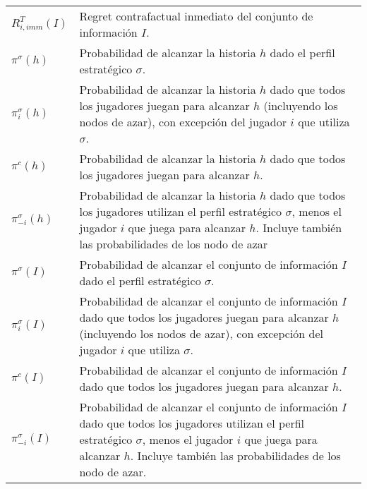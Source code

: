 \begingroup
\renewcommand{\arraystretch}{1.5}
\begin{tabular}{l p{12cm}}
$R^T_{i, imm}(I)$ & Regret contrafactual inmediato del conjunto de información $I$. \\
$\pi^{\sigma}(h)$ & Probabilidad de alcanzar la historia $h$ dado el perfil estratégico $\sigma$. \\
$\pi^{\sigma}_i(h)$ & Probabilidad de alcanzar la historia $h$ dado que todos los jugadores juegan para alcanzar $h$ (incluyendo los nodos de azar), con excepción del jugador $i$ que utiliza $\sigma$. \\
$\pi^c(h)$ & Probabilidad de alcanzar la historia $h$ dado que todos los jugadores juegan para alcanzar $h$. \\
$\pi^{\sigma}_{-i}(h)$ & Probabilidad de alcanzar la historia $h$ dado que todos los jugadores utilizan el perfil estratégico $\sigma$, menos el jugador $i$ que juega para alcanzar $h$. Incluye también las probabilidades de los nodo de azar \\
$\pi^{\sigma}(I)$ & Probabilidad de alcanzar el conjunto de información $I$ dado el perfil estratégico $\sigma$. \\
$\pi^{\sigma}_i(I)$ & Probabilidad de alcanzar el conjunto de información $I$ dado que todos los jugadores juegan para alcanzar $h$ (incluyendo los nodos de azar), con excepción del jugador $i$ que utiliza $\sigma$. \\
$\pi^c(I)$ & Probabilidad de alcanzar el conjunto de información $I$ dado que todos los jugadores juegan para alcanzar $h$. \\
$\pi^{\sigma}_{-i}(I)$ & Probabilidad de alcanzar el conjunto de información $I$ dado que todos los jugadores utilizan el perfil estratégico $\sigma$, menos el jugador $i$ que juega para alcanzar $h$. Incluye también las probabilidades de los nodo de azar.
\end{tabular}
\endgroup

